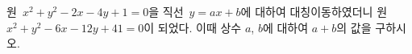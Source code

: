 원~$x^2+y^2-2x-4y+1=0$을 직선~$y=ax+b$에 대하여 대칭이동하였더니 원~$x^2+y^2-6x-12y+41=0$이 되었다. 이때 상수 $a$, $b$에 대하여 $a+b$의 값을 구하시오.

